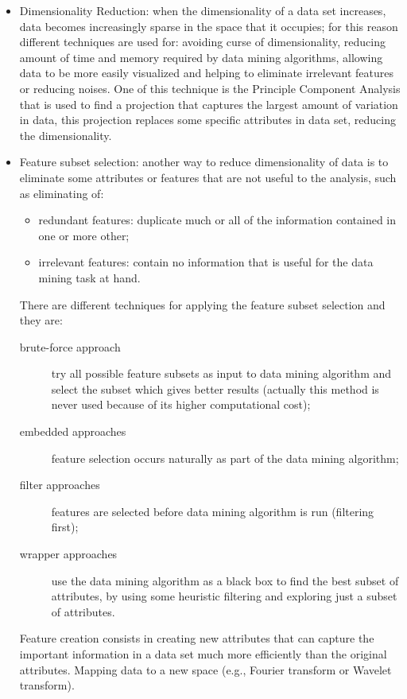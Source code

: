 \begin{description}
\begin{itemize}
\begin{itemize}
		\end{itemize}
		\item Dimensionality Reduction: when the dimensionality of a data set increases, data becomes increasingly sparse in the space that it occupies; for this reason different techniques are used for: avoiding curse of dimensionality, reducing amount of time and memory required by data mining algorithms, allowing data to be more easily visualized and helping to eliminate irrelevant features or reducing noises.
		One of this technique is the Principle Component Analysis that is used to find a projection that captures the largest amount of variation in data, this projection replaces some specific attributes in data set, reducing the dimensionality.
		\item Feature subset selection: another way to reduce dimensionality of data is to eliminate some attributes or features that are not useful to the analysis, such as eliminating of:
		\begin{itemize}
			\item redundant features: duplicate much or all of the information contained in one or more other;
			\item irrelevant features: contain no information that is useful for the data mining task at hand.
		\end{itemize}
		There are different techniques for applying the feature subset selection and they are:
		\begin{description}
			\item[brute-force approach] try all possible feature subsets as input to data mining algorithm and select the subset which gives better results (actually this method is never used because of its higher computational cost);
			\item[embedded approaches] feature selection occurs naturally as part of the data mining algorithm;
			\item[filter approaches] features are selected before data mining algorithm is run (filtering first);
			\item[wrapper approaches] use the data mining algorithm as a black box to find the best subset of attributes, by using some heuristic filtering and exploring just a subset of attributes.
		\end{description}
		Feature creation consists in creating new attributes that can capture the important information in a data set much more efficiently than the original attributes.
		Mapping data to a new space (e.g., Fourier transform or Wavelet transform).

\end{itemize}
\end{description}
